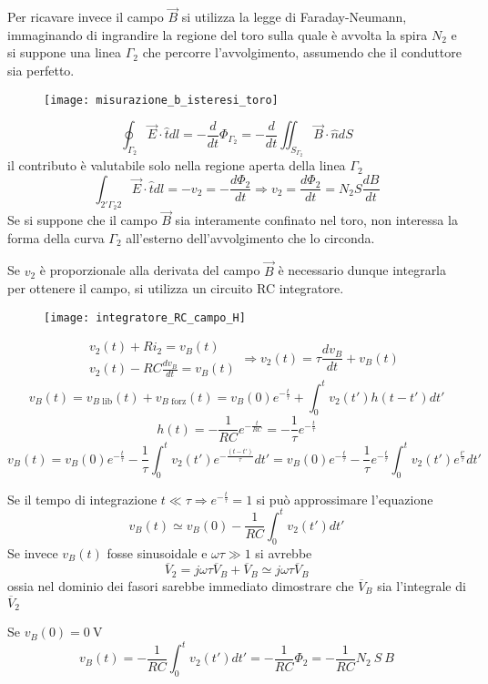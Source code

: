 Per ricavare invece il campo $\vec{B}$ si utilizza la legge di Faraday-Neumann, immaginando
di ingrandire la regione del toro sulla quale è avvolta la spira $N_2$ e si suppone una 
linea $\Gamma_2$ che percorre l'avvolgimento, assumendo che il conduttore sia perfetto.
\begin{figure}[H]
\centering
\texttt{[image: misurazione\_b\_isteresi\_toro]}
\end{figure}
$$
\oint_{\Gamma_2} \vec{E}\cdot\hat{t}dl = -\frac{d}{dt} \Phi_{\Gamma_2} = -\frac{d}{dt} \iint_{S_{\Gamma_2}}\vec{B}\cdot\hat{n}dS
$$
il contributo è valutabile solo nella regione aperta della linea $\Gamma_2$
$$
\int_{2'\Gamma_2 2} \vec{E}\cdot\hat{t}dl = -v_2 = - \frac{d\Phi_2}{dt}\Rightarrow v_2 = \frac{d\Phi_2}{dt} = N_2 S \frac{dB}{dt}
$$
Se si suppone che il campo $\vec{B}$ sia interamente confinato nel toro, non interessa
la forma della curva $\Gamma_2$ all'esterno dell'avvolgimento che lo circonda.

Se $v_2$ è proporzionale alla derivata del campo $\vec{B}$ è necessario dunque
integrarla per ottenere il campo, si utilizza un circuito RC integratore.
\begin{figure}[H]
\centering
\texttt{[image: integratore\_RC\_campo\_H]}
\end{figure}
$$
\begin{aligned}
& v_2(t) +Ri_2 = v_B(t)\\
& v_2(t) - RC\frac{dv_B}{dt} = v_B(t)
\end{aligned}
\Rightarrow v_2(t) = \tau \frac{dv_B}{dt} + v_B(t)
$$
$$
v_B(t) = v_{B\text{ lib}}(t) + v_{B\text{ forz}}(t) = v_B(0)e^{-\frac{t}{\tau}} + \int_0^t 
v_2(t')h(t-t')dt'
$$
$$
h(t) = -\frac{1}{RC} e^{-\frac{t}{RC}} = -\frac{1}{\tau} e^{-\frac{t}{\tau}}
$$
$$
v_B(t) = v_B(0) e^{-\frac{t}{\tau}} - \frac{1}{\tau} \int_0^t v_2(t') e^{-\frac{(t-t')}{\tau}} dt' =  v_B(0) e^{-\frac{t}{\tau}} - \frac{1}{\tau}e^{-\frac{t}{\tau}} \int_0^t v_2(t') e^{\frac{t'}{\tau}} dt'
$$

Se il tempo di integrazione $t \ll \tau \Rightarrow e^{-\frac{t}{\tau}}=1$ si può approssimare l'equazione
$$
v_B(t) \simeq v_B(0) - \frac{1}{RC} \int_0^t v_2(t') dt'
$$
Se invece $v_B(t)$ fosse sinusoidale e $\omega\tau \gg 1$ si avrebbe
$$
\overline{V}_2 = j\omega\tau \overline{V}_B + \overline{V}_B \simeq j\omega \tau \overline{V}_B
$$
ossia nel dominio dei fasori sarebbe immediato dimostrare che $\overline{V}_B$ sia 
l'integrale di $\overline{V}_2$

Se $v_B(0) = \SI{0}{\volt}$ 
$$
v_B(t) = -\frac{1}{RC} \int_0^t v_2(t') dt' = -\frac{1}{RC}\Phi_2 = -\frac{1}{RC} N_2\ S\ B 
$$

